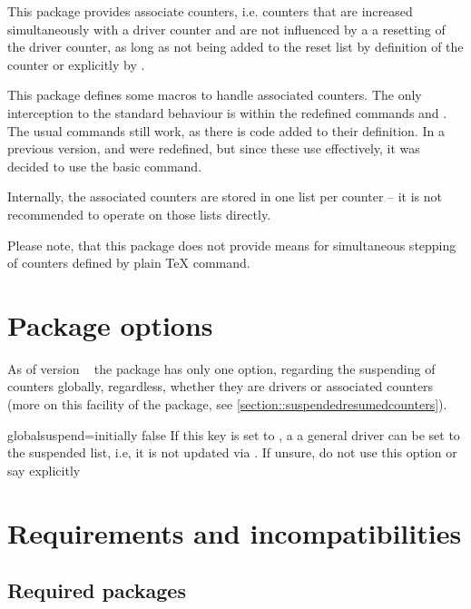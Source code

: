 \documentclass[12pt,paper=a4]{article}
\def\packageversion{\assoccntpackageversion}%
\begin{document}
This package provides associate counters, i.e. counters that are increased simultaneously with a driver counter and are not influenced by a a resetting of the driver counter, as long as not being added to the reset list by definition of the counter or explicitly by . 

This package defines some macros to handle associated counters. The only interception to the standard behaviour is within the redefined commands  and . The usual commands still work, as there is code added to their definition. In a previous version,  and  were redefined, but since these use  effectively, it was decided to use the basic command. 

Internally, the associated counters are stored in one list per counter -- it is not recommended to operate on those lists directly. 

Please note, that this package does not provide means for simultaneous stepping of counters defined by plain \TeX{}  command.


\section{Package options}%

As of version \packageversion~ the package has only one option, regarding the suspending of counters globally, regardless, whether they are drivers or associated counters (more on this facility of the package, see \ref{section::suspendedresumedcounters}).

\begin{docKey}{globalsuspend}{=}{initially false}
  If this key is set to , a a general driver can be set to the suspended list, i.e, it is not updated via . If unsure, do not use this option or say explicitly 

  \begin{dispListing}
    \usepackage[globalsuspend=false]{assoccnt}
  \end{dispListing}%
\end{docKey}



\section{Requirements and incompatibilities}%

\subsection{Required packages}
\end{document}
